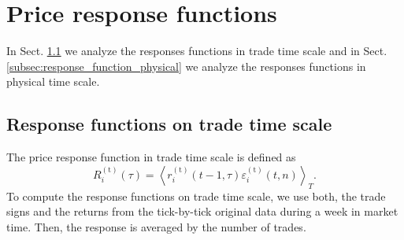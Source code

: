 \section{Price response functions}\label{sec:response_functions}

In Sect. \ref{subsec:response_function_trade} we analyze the responses
functions in trade time scale and in Sect.
\ref{subsec:response_function_physical} we analyze the responses functions in
physical time scale.


\subsection{Response functions on trade time scale}
\label{subsec:response_function_trade}

The price response function in trade time scale is defined as
\cite{my_paper_response_financial}
\begin{equation}\label{eq:response_functions_trade_scale_general}
    R^{\left(\textrm{t}\right)}_{i}\left(\tau\right)=\left\langle
    r^{\left(\textrm{t}\right)}_{i}\left(t-1,\tau \right)
    \varepsilon_{i}^{\left(\textrm{t}\right)}
    \left(t, n\right)\right\rangle _{T}.
\end{equation}
To compute the response functions on trade time scale, we use both, the trade
signs and the returns from the tick-by-tick original data during a week in
market time. Then, the response is averaged by the number of trades.

